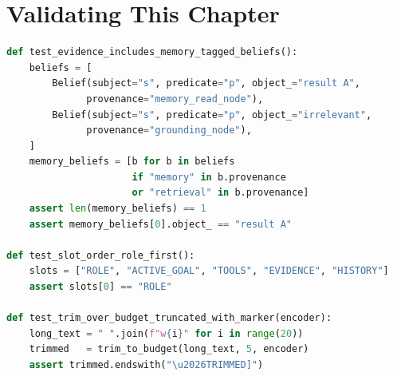 \section{Validating This Chapter}
\label{sec:ch6-tests}

\begin{lstlisting}[language=Python,
    caption={Representative Chapter 6 unit tests (tests/unit/test\_ch06.py)},
    label={lst:ch06-tests}]
def test_evidence_includes_memory_tagged_beliefs():
    beliefs = [
        Belief(subject="s", predicate="p", object_="result A",
              provenance="memory_read_node"),
        Belief(subject="s", predicate="p", object_="irrelevant",
              provenance="grounding_node"),
    ]
    memory_beliefs = [b for b in beliefs
                      if "memory" in b.provenance
                      or "retrieval" in b.provenance]
    assert len(memory_beliefs) == 1
    assert memory_beliefs[0].object_ == "result A"

def test_slot_order_role_first():
    slots = ["ROLE", "ACTIVE_GOAL", "TOOLS", "EVIDENCE", "HISTORY"]
    assert slots[0] == "ROLE"

def test_trim_over_budget_truncated_with_marker(encoder):
    long_text = " ".join(f"w{i}" for i in range(20))
    trimmed   = trim_to_budget(long_text, 5, encoder)
    assert trimmed.endswith("\u2026TRIMMED]")
\end{lstlisting}

